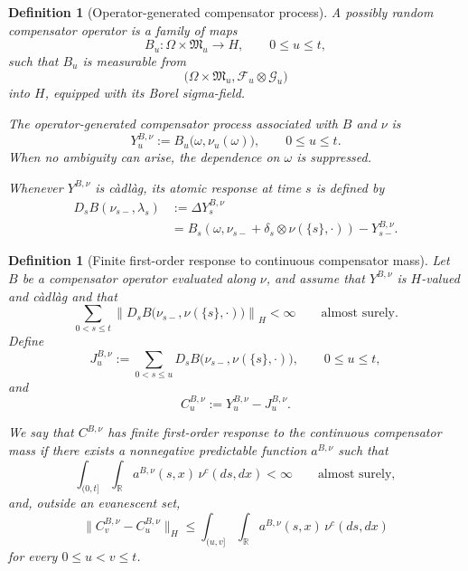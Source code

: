 \documentclass[a4paper,10pt]{article}
\newtheorem{defin}[thm]{Definition}
\begin{document}
\begin{defin}[Operator-generated compensator process]
A possibly random compensator operator is a family of maps
\[
B_u:
\Omega\times\mathfrak M_u
\longrightarrow H,
\qquad 0\le u\le t,
\]
such that \(B_u\) is measurable from
\[
\bigl(\Omega\times\mathfrak M_u,
      \mathcal F_u\otimes\mathcal G_u\bigr)
\]
into \(H\), equipped with its Borel sigma-field.

The operator-generated compensator process associated with \(B\) and
\(\nu\) is
\[
Y_u^{B,\nu}
:=
B_u\bigl(\omega,\nu_u(\omega)\bigr),
\qquad 0\le u\le t.
\]
When no ambiguity can arise, the dependence on \(\omega\) is
suppressed.

Whenever \(Y^{B,\nu}\) is càdlàg, its atomic response at time \(s\) is
defined by
\[
\begin{aligned}
D_sB(\nu_{s-},\lambda_s)
&:=
\Delta Y_s^{B,\nu}
\\
&=
B_s\left(
\omega,
\nu_{s-}
+
\delta_s\otimes\nu(\{s\},\cdot)
\right)
-
Y_{s-}^{B,\nu}.
\end{aligned}
\]
\end{defin}

\begin{defin}[Finite first-order response to continuous compensator mass]
Let \(B\) be a compensator operator evaluated along \(\nu\), and assume
that \(Y^{B,\nu}\) is \(H\)-valued and càdlàg and that
\[
\sum_{0<s\le t}
\left\lVert
D_sB\bigl(
        \nu_{s-},
        \nu(\{s\},\cdot)
\bigr)
\right\rVert_H
<
\infty
\qquad\text{almost surely}.
\]
Define
\[
J_u^{B,\nu}
:=
\sum_{0<s\le u}
D_sB\bigl(
        \nu_{s-},
        \nu(\{s\},\cdot)
\bigr),
\qquad 0\le u\le t,
\]
and
\[
C_u^{B,\nu}
:=
Y_u^{B,\nu}-J_u^{B,\nu}.
\]

We say that \(C^{B,\nu}\) has finite first-order response to the
continuous compensator mass if there exists a nonnegative predictable
function \(a^{B,\nu}\) such that
\[
\int_{(0,t]}\int_{\mathbb R}
a^{B,\nu}(s,x)\,\nu^c(ds,dx)
<
\infty
\qquad\text{almost surely},
\]
and, outside an evanescent set,
\[
\lVert
C_v^{B,\nu}-C_u^{B,\nu}
\rVert_H
\le
\int_{(u,v]}\int_{\mathbb R}
a^{B,\nu}(s,x)\,\nu^c(ds,dx)
\]
for every \(0\le u<v\le t\).
\end{defin}
\end{document}
